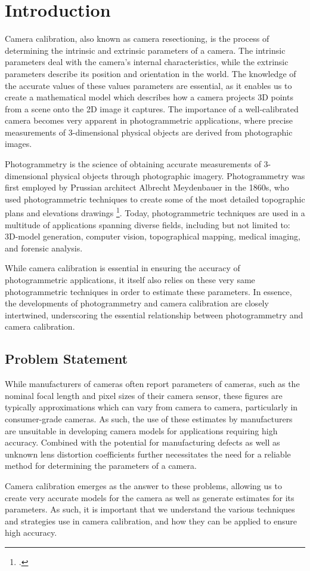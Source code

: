\section{Introduction}

Camera calibration, also known as camera resectioning, is the process of determining the intrinsic and extrinsic parameters of a camera. The intrinsic parameters deal with the camera's internal characteristics, while the extrinsic parameters describe its position and orientation in the world. The knowledge of the accurate values of these values parameters are essential, as it enables us to create a mathematical model which describes how a camera projects 3D points from a scene onto the 2D image it captures. The importance of a well-calibrated camera becomes very apparent in photogrammetric applications, where precise measurements of 3-dimensional physical objects are derived from photographic images.

Photogrammetry is the science of obtaining accurate measurements of 3-dimensional physical objects through photographic imagery. Photogrammetry was first employed by Prussian architect Albrecht Meydenbauer in the 1860s, who used photogrammetric techniques to create some of the most detailed topographic plans and elevations drawings \footcite[][1]{albertzLookBack2007}. Today, photogrammetric techniques are used in a multitude of applications spanning diverse fields, including but not limited to: 3D-model generation, computer vision, topographical mapping, medical imaging, and forensic analysis. 

While camera calibration is essential in ensuring the accuracy of photogrammetric applications, it itself also relies on these very same photogrammetric techniques in order to estimate these parameters. In essence, the developments of photogrammetry and camera calibration are closely intertwined, underscoring the essential relationship between photogrammetry and camera calibration.

\subsection{Problem Statement}

While manufacturers of cameras often report parameters of cameras, such as the nominal focal length and pixel sizes of their camera sensor, these figures are typically approximations which can vary from camera to camera, particularly in consumer-grade cameras. As such, the use of these estimates by manufacturers are unsuitable in developing camera models for applications requiring high accuracy. Combined with the potential for manufacturing defects as well as unknown lens distortion coefficients further necessitates the need for a reliable method for determining the parameters of a camera. 

Camera calibration emerges as the answer to these problems, allowing us to create very accurate models for the camera as well as generate estimates for its parameters. As such, it is important that we understand the various techniques and strategies use in camera calibration, and how they can be applied to ensure high accuracy.
